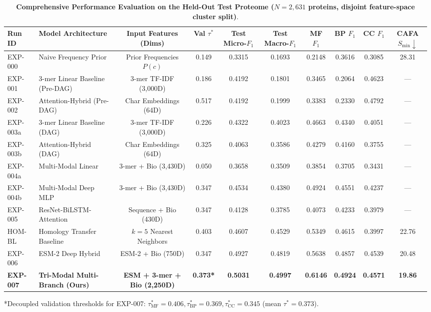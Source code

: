 \documentclass[journal]{IEEEtran}
\begin{document}
\begin{table}[t]
\centering
\caption{\textbf{Comprehensive Performance Evaluation on the Held-Out Test Proteome ($N=2,631$ proteins, disjoint feature-space cluster split)}.}
\label{tab:main_results}
\begin{adjustbox}{width=\textwidth}
\begin{tabular}{llcccccccc}
\toprule
\textbf{Run ID} & \textbf{Model Architecture} & \textbf{Input Features (Dims)} & \textbf{Val $\tau^*$} & \textbf{Test Micro-$F_1$} & \textbf{Test Macro-$F_1$} & \textbf{MF $F_1$} & \textbf{BP $F_1$} & \textbf{CC $F_1$} & \textbf{CAFA $S_{\min} \downarrow$} \\
\midrule
EXP-000 & Naive Frequency Prior & Prior Frequencies $P(c)$ & 0.149 & 0.3315 & 0.1693 & 0.2148 & 0.3616 & 0.3085 & 28.31 \\
EXP-001 & 3-mer Linear Baseline (Pre-DAG) & 3-mer TF-IDF (3,000D) & 0.186 & 0.4192 & 0.1801 & 0.3465 & 0.2064 & 0.4623 & --- \\
EXP-002 & Attention-Hybrid (Pre-DAG) & Char Embeddings (64D) & 0.517 & 0.4192 & 0.1999 & 0.3383 & 0.2330 & 0.4792 & --- \\
EXP-003a & 3-mer Linear Baseline (DAG) & 3-mer TF-IDF (3,000D) & 0.226 & 0.4322 & 0.4023 & 0.4663 & 0.4340 & 0.4051 & --- \\
EXP-003b & Attention-Hybrid (DAG) & Char Embeddings (64D) & 0.325 & 0.4063 & 0.3586 & 0.4279 & 0.4160 & 0.3755 & --- \\
EXP-004a & Multi-Modal Linear & 3-mer + Bio (3,430D) & 0.050 & 0.3658 & 0.3509 & 0.3854 & 0.3705 & 0.3431 & --- \\
EXP-004b & Multi-Modal Deep MLP & 3-mer + Bio (3,430D) & 0.347 & 0.4534 & 0.4380 & 0.4924 & 0.4551 & 0.4237 & --- \\
EXP-005 & ResNet-BiLSTM-Attention & Sequence + Bio (430D) & 0.347 & 0.4128 & 0.3785 & 0.4073 & 0.4233 & 0.3979 & --- \\
HOM-BL & Homology Transfer Baseline & $k=5$ Nearest Neighbors & 0.403 & 0.4607 & 0.4529 & 0.5349 & 0.4615 & 0.3997 & 22.76 \\
EXP-006 & ESM-2 Deep Hybrid & ESM-2 + Bio (750D) & 0.347 & 0.4927 & 0.4819 & 0.5638 & 0.4857 & 0.4539 & 20.48 \\
\textbf{EXP-007} & \textbf{Tri-Modal Multi-Branch (Ours)} & \textbf{ESM + 3-mer + Bio (2,250D)} & \textbf{0.373*} & \textbf{0.5031} & \textbf{0.4997} & \textbf{0.6146} & \textbf{0.4924} & \textbf{0.4571} & \textbf{19.86} \\
\bottomrule
\end{tabular}
\end{adjustbox}
\vspace{1mm}
\footnotesize{*Decoupled validation thresholds for EXP-007: $\tau^*_{\text{MF}} = 0.406, \tau^*_{\text{BP}} = 0.369, \tau^*_{\text{CC}} = 0.345$ (mean $\tau^* = 0.373$).}
\end{table}
\end{document}
